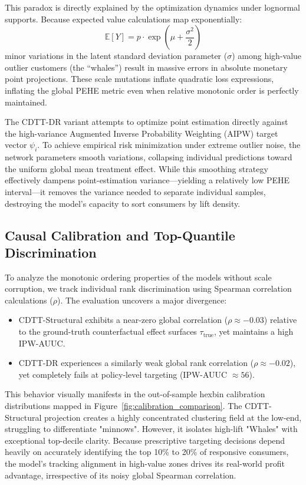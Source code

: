 \documentclass[10pt, conference]{IEEEtran}
\newcommand{\ourmodel}{CDTT}
\begin{document}
This paradox is directly explained by the optimization dynamics under lognormal supports. Because expected value calculations map exponentially:
\begin{equation}
\mathbb{E}[Y] = p \cdot \exp\left(\mu + \frac{\sigma^2}{2}\right)
\end{equation}
minor variations in the latent standard deviation parameter ($\sigma$) among high-value outlier customers (the ``whales'') result in massive errors in absolute monetary point projections. These scale mutations inflate quadratic loss expressions, inflating the global PEHE metric even when relative monotonic order is perfectly maintained. 

The \ourmodel-DR variant attempts to optimize point estimation directly against the high-variance Augmented Inverse Probability Weighting (AIPW) target vector $\psi_i$. To achieve empirical risk minimization under extreme outlier noise, the network parameters smooth variations, collapsing individual predictions toward the uniform global mean treatment effect. While this smoothing strategy effectively dampens point-estimation variance—yielding a relatively low PEHE interval—it removes the variance needed to separate individual samples, destroying the model's capacity to sort consumers by lift density.

\subsection{Causal Calibration and Top-Quantile Discrimination}
To analyze the monotonic ordering properties of the models without scale corruption, we track individual rank discrimination using Spearman correlation calculations ($\rho$). The evaluation uncovers a major divergence:
\begin{itemize}
    \item \ourmodel-Structural exhibits a near-zero global correlation ($\rho \approx -0.03$) relative to the ground-truth counterfactual effect surfaces $\tau_{\text{true}}$, yet maintains a high IPW-AUUC.
    \item \ourmodel-DR experiences a similarly weak global rank correlation ($\rho \approx -0.02$), yet completely fails at policy-level targeting (IPW-AUUC $\approx 56$).
\end{itemize}

This behavior visually manifests in the out-of-sample hexbin calibration distributions mapped in Figure~\ref{fig:calibration_comparison}. The \ourmodel-Structural projection creates a highly concentrated clustering field at the low-end, struggling to differentiate "minnows". However, it isolates high-lift "Whales" with exceptional top-decile clarity. Because prescriptive targeting decisions depend heavily on accurately identifying the top 10\% to 20\% of responsive consumers, the model's tracking alignment in high-value zones drives its real-world profit advantage, irrespective of its noisy global Spearman correlation.
\end{document}
